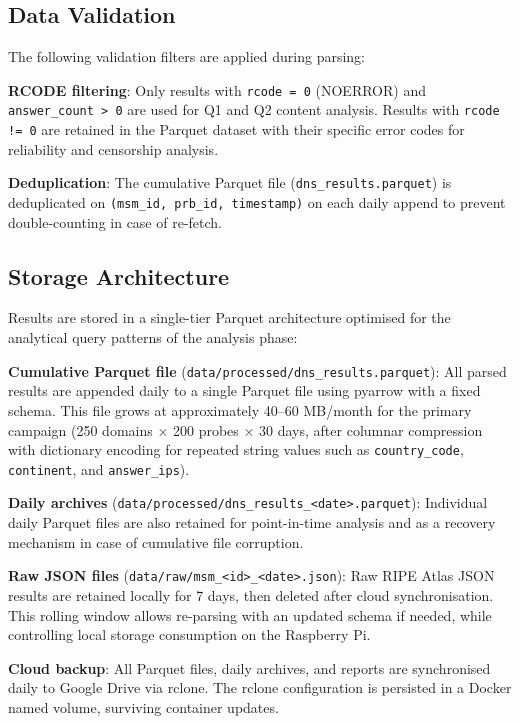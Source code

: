 \subsection{Data Validation}
\label{subsec:3.4.3}

The following validation filters are applied during parsing:

\textbf{RCODE filtering}: Only results with \texttt{rcode = 0} (NOERROR) and \texttt{answer\_count > 0} are used for Q1 and Q2 content analysis. Results with \texttt{rcode != 0} are retained in the Parquet dataset with their specific error codes for reliability and censorship analysis.

\textbf{Deduplication}: The cumulative Parquet file (\texttt{dns\_results.parquet}) is deduplicated on \texttt{(msm\_id, prb\_id, timestamp)} on each daily append to prevent double-counting in case of re-fetch.

\subsection{Storage Architecture}
\label{subsec:3.4.4}

Results are stored in a single-tier Parquet architecture optimised for the analytical query patterns of the analysis phase:

\textbf{Cumulative Parquet file} (\texttt{data/processed/dns\_results.parquet}): All parsed results are appended daily to a single Parquet file using pyarrow with a fixed schema. This file grows at approximately 40--60 MB/month for the primary campaign (250 domains $\times$ 200 probes $\times$ 30 days, after columnar compression with dictionary encoding for repeated string values such as \texttt{country\_code}, \texttt{continent}, and \texttt{answer\_ips}).

\textbf{Daily archives} (\texttt{data/processed/dns\_results\_<date>.parquet}): Individual daily Parquet files are also retained for point-in-time analysis and as a recovery mechanism in case of cumulative file corruption.

\textbf{Raw JSON files} (\texttt{data/raw/msm\_<id>\_<date>.json}): Raw RIPE Atlas JSON results are retained locally for 7 days, then deleted after cloud synchronisation. This rolling window allows re-parsing with an updated schema if needed, while controlling local storage consumption on the Raspberry Pi.

\textbf{Cloud backup}: All Parquet files, daily archives, and reports are synchronised daily to Google Drive via rclone. The rclone configuration is persisted in a Docker named volume, surviving container updates.

